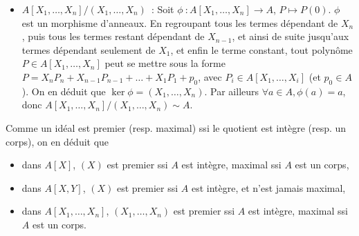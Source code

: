 {{\begin{itemize}
   \item $A[X_{1},\dots,X_{n}]/(X_{1},\dots,X_{n})$~:
     Soit $\phi~:A[X_{1},\dots,X_{n}]\to A$, $P\mapsto P(0)$. $\phi$ est
     un morphisme d'anneaux. En regroupant tous les termes dépendant de
     $X_{n}$, puis tous les termes restant dépendant de $X_{n-1}$, et
     ainsi de suite jusqu'aux termes dépendant seulement de $X_{1}$, et
     enfin le terme constant, tout polynôme $P\in A[X_{1},\dots,X_{n}]$
     peut se mettre sous la forme
     $P=X_{n}P_{n}+X_{n-1}P_{n-1}+\dots+X_{1}P_{1}+p_{0}$, avec $P_{i}\in
     A[X_{1},\dots,X_{i}]$ (et $p_{0}\in A$). On en déduit que
     $\ker\phi=(X_{1},\dots,X_{n})$. Par ailleurs $\forall a\in A,
     \phi(a)=a$, donc $A[X_{1},\dots,X_{n}]/(X_{1},\dots,X_{n})\sim A$.
  \end{itemize}
  
  Comme un idéal est premier (resp. maximal) ssi le quotient est intègre
  (resp. un corps), on en déduit que
  \begin{itemize}
  \item dans $A[X]$, $(X)$ est premier ssi $A$ est intègre, maximal ssi $A$ est un corps,
  \item dans $A[X,Y]$, $(X)$ est premier ssi $A$ est intègre, et n'est jamais maximal,
  \item dans $A[X_{1},\dots,X_{n}]$, $(X_{1},\dots,X_{n})$ est premier
    ssi $A$ est intègre, maximal ssi $A$ est un corps.
  \end{itemize}
}
}
